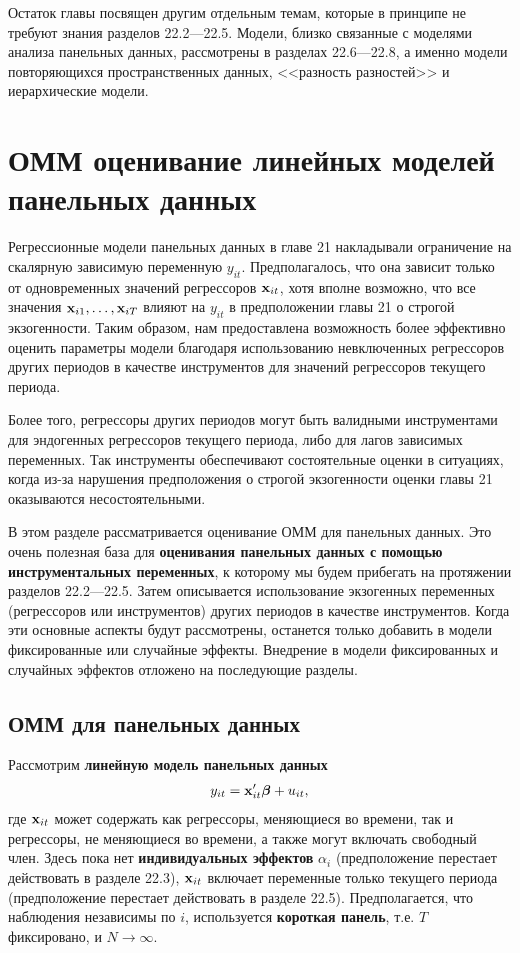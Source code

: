 Остаток главы посвящен другим отдельным темам, которые в принципе не требуют знания разделов 22.2---22.5. Модели,  близко связанные с моделями анализа панельных данных, рассмотрены в разделах 22.6---22.8, а именно модели повторяющихся пространственных данных, <<разность разностей>> и иерархические модели.

\section{ОММ оценивание линейных моделей панельных данных}

Регрессионные модели панельных данных в главе 21 накладывали ограничение на скалярную зависимую переменную $y_{it}$. Предполагалось, что она зависит только от одновременных значений регрессоров $\mathbf{x}_{it}$, хотя вполне возможно, что все значения $\mathbf{x}_{i1}, \dots, \mathbf{x}_{iT}$ влияют на $y_{it}$ в предположении главы 21 о строгой экзогенности. Таким образом, нам предоставлена возможность более эффективно оценить параметры модели благодаря использованию невключенных регрессоров других периодов в качестве инструментов для значений регрессоров текущего периода.

Более того, регрессоры других периодов могут быть валидными инструментами для эндогенных регрессоров текущего периода, либо для лагов зависимых переменных. Так инструменты обеспечивают состоятельные оценки в ситуациях, когда из-за нарушения предположения о строгой экзогенности оценки главы 21 оказываются несостоятельными.

В этом разделе рассматривается оценивание ОММ для панельных данных. Это очень полезная база для \textbf{оценивания панельных данных с помощью инструментальных переменных}, к которому мы будем прибегать на протяжении разделов 22.2---22.5. Затем описывается использование экзогенных переменных (регрессоров или инструментов)  других периодов в качестве инструментов. Когда эти основные аспекты будут рассмотрены, останется только добавить в модели фиксированные или случайные эффекты. Внедрение в модели фиксированных и случайных эффектов отложено на последующие разделы. 

\subsection{ОММ для панельных данных}

Рассмотрим \textbf{линейную модель панельных данных}
\begin{align}
y_{it}=\mathbf{x}'_{it}\bm\beta+u_{it},
\label{Eq:22.1}
\end{align}
где $\mathbf{x}_{it}$ может содержать как регрессоры, меняющиеся во времени, так и регрессоры, не меняющиеся во времени, а также могут включать свободный член. Здесь пока нет \textbf{индивидуальных эффектов} $\alpha_i$ (предположение перестает действовать в разделе 22.3), $\mathbf{x}_{it}$  включает переменные только текущего периода (предположение перестает действовать в разделе 22.5). Предполагается, что наблюдения независимы по $i$, используется \textbf{короткая панель}, т.е. $T$ фиксировано, и $N \rightarrow \infty$.

